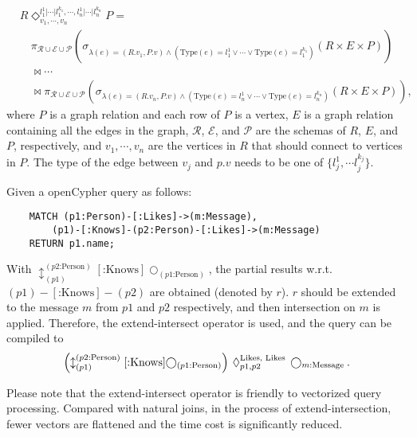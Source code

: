 \begin{equation}
    \begin{split}
        & R \Diamond^{l_1^{1}|\cdots|l_1^{k_1}, \cdots, l_n^{1}|\cdots|l_n^{k_n}}_{v_1, \cdots, v_n} P = \\ 
        & \hspace{1em} \pi_{\mathcal{R} \cup \mathcal{E} \cup \mathcal{P}}(\sigma_{\lambda(e) = (R.v_1, P.v) \land (\text{Type}(e) = l_1^1 \lor \cdots \lor \text{Type}(e) = l_1^{k_1})}(R \times E \times P)) \\
        & \hspace{1em} \Join \cdots \\
        & \hspace{1em} \Join \pi_{\mathcal{R} \cup \mathcal{E} \cup \mathcal{P}}(\sigma_{\lambda(e) = (R.v_n, P.v) \land (\text{Type}(e) = l_n^1 \lor \cdots \lor \text{Type}(e) = l_n^{k_n})}(R \times E \times P)),
    \end{split}
\end{equation}
where $P$ is a graph relation and each row of $P$ is a vertex,
$E$ is a graph relation containing all the edges in the graph, 
$\mathcal{R}$, $\mathcal{E}$, and $\mathcal{P}$ are the schemas of $R$, $E$, and $P$, respectively,
and $v_1, \cdots, v_n$ are the vertices in $R$ that should connect to vertices in $P$.
The type of the edge between $v_j$ and $p.v$ needs to be one of $\{l_j^1, \cdots l_j^{k_j}\}$.

Given a openCypher query as follows:
\begin{lstlisting}
    MATCH (p1:Person)-[:Likes]->(m:Message),
        (p1)-[:Knows]-(p2:Person)-[:Likes]->(m:Message)
    RETURN p1.name;
\end{lstlisting}
With $\updownarrow^{(p2\text{:Person})}_{(p1)}[\text{:Knows}]\bigcirc_{(p1\text{:Person})}$, the partial results w.r.t.~$(p1)-[\text{:Knows}]-(p2)$ are obtained (denoted by $r$). 
$r$ should be extended to the message $m$ from $p1$ and $p2$ respectively, and then intersection on $m$ is applied.
Therefore, the extend-intersect operator is used, and the query can be compiled to
\begin{equation}
    \left(\updownarrow^{(p2\text{:Person})}_{(p1)}[\text{:Knows}]\bigcirc_{(p1\text{:Person})}\right) \hspace{0.2em} \Diamond_{p1, p2}^{\text{Likes, Likes}} \hspace{0.2em} \bigcirc_{m\text{:Message}}.
\end{equation}

Please note that the extend-intersect operator is friendly to vectorized query processing.
Compared with natural joins, in the process of extend-intersection, fewer vectors are flattened and the time cost is significantly reduced.


